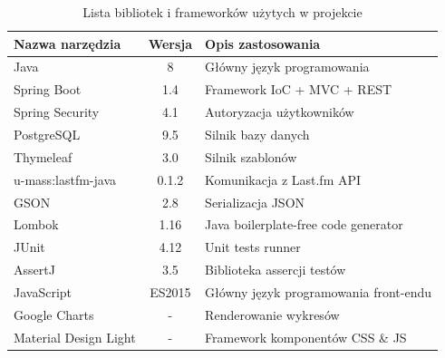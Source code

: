 \documentclass[openright]{xmgr}
\begin{document}
\begin{table}[h]
\begin{tabular}{|l|c|l|}
	\hline
	Nazwa narzędzia & Wersja & Opis zastosowania \\
	\hline
	Java & 8 & Główny język programowania \\
	\hline
	Spring Boot & 1.4 & Framework IoC + MVC + REST \\
    \hline
	Spring Security & 4.1 & Autoryzacja użytkowników \\
	\hline
	PostgreSQL & 9.5 & Silnik bazy danych \\
	\hline
	Thymeleaf & 3.0 & Silnik szablonów \\
	\hline
	u-mass:lastfm-java & 0.1.2 & Komunikacja z Last.fm API \\
	\hline
	GSON & 2.8 & Serializacja JSON \\
	\hline
	Lombok & 1.16 & Java boilerplate-free code generator \\
	\hline
	JUnit & 4.12 & Unit tests runner \\
	\hline
	AssertJ & 3.5 & Biblioteka assercji testów \\
	\hline
    JavaScript & ES2015 & Główny język programowania front-endu \\
    \hline
    Google Charts & - & Renderowanie wykresów \\
    \hline
    Material Design Light & - & Framework komponentów CSS \& JS \\
    \hline
\end{tabular}
    \caption{Lista bibliotek i frameworków użytych w projekcie}
	\label{tools-used}
\end{table}




\listoftables

\listoffigures

\oswiadczenie
\end{document}
